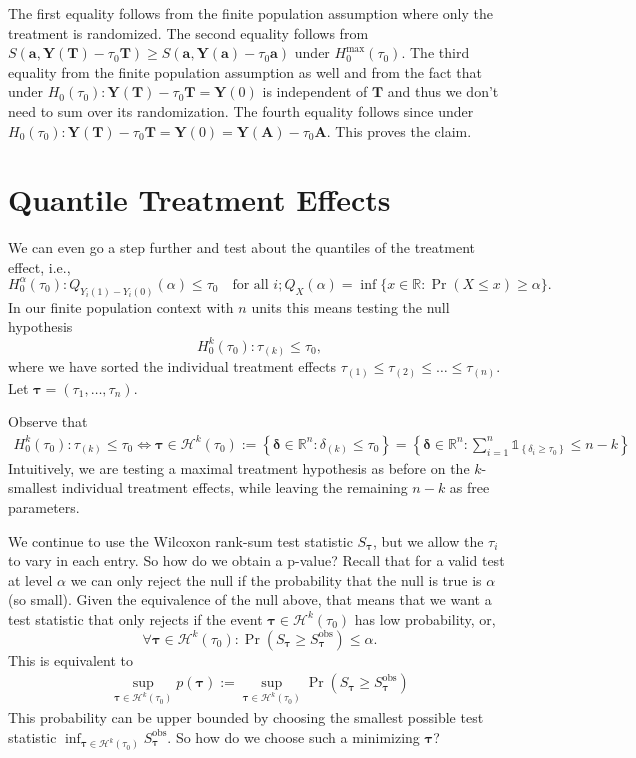 \documentclass[11pt]{exam}
\theoremstyle{plain}
\newcommand{\R}{\mathbb{R}}
\newcommand{\lt}{\left}
\newcommand{\rt}{\right}
\newcommand{\Ind}[1]{\mathds{1}_{\lt\{ #1 \rt\}}}
\begin{document}
The first equality follows from the finite population assumption where only the treatment is randomized. The second equality follows from $S(\bm{a}, \bm{Y}(\bm{T}) - \tau_0 \bm{T}) \geq S(\bm{a}, \bm{Y}(\bm{a}) - \tau_0 \bm{a})$ under $H^{\max}_0(\tau_0)$. The third equality from the finite population assumption as well and from the fact that under $H_0(\tau_0): \bm{Y}(\bm{T}) - \tau_0 \bm{T} = \bm{Y}(0)$ is independent of $\bm{T}$ and thus we don't need to sum over its randomization. The fourth equality follows since under $H_0(\tau_0): \bm{Y}(\bm{T}) - \tau_0 \bm{T} = \bm{Y}(0) = \bm{Y}(\bm{A}) - \tau_0 \bm{A}$. This proves the claim. 

\section{Quantile Treatment Effects}
We can even go a step further and test about the quantiles of the treatment effect, i.e., 
\[
H^\alpha_0(\tau_0): Q_{Y_i(1) - Y_i(0)}(\alpha) \leq \tau_0 \quad \text{for all } i; Q_X(\alpha) = \inf\{x \in \R: \Pr(X \leq x) \geq \alpha\}.
\]
In our finite population context with $n$ units this means testing the null hypothesis
\[
H_0^k(\tau_0): \tau_{(k)} \leq \tau_0,
\]
where we have sorted the individual treatment effects $\tau_{(1)} \leq \tau_{(2)} \leq \ldots \leq \tau_{(n)}$. Let $\bm \tau = (\tau_1, \ldots, \tau_n)$.

Observe that 
\begin{align*}
    H_0^k(\tau_0): \tau_{(k)} \leq \tau_0 \Leftrightarrow \bm{\tau} \in \mathcal{H}^k(\tau_0) := \lt\{ \bm{\delta} \in \R^n : \delta_{(k)} \leq \tau_0 \rt\} =\lt\{ \bm{\delta} \in \R^n : \sum_{i=1}^n\Ind{\delta_i \geq \tau_0} \leq n-k \rt\}
\end{align*}
Intuitively, we are testing a maximal treatment hypothesis as before on the $k$-smallest individual treatment effects, while leaving the remaining $n-k$ as free parameters.

We continue to use the Wilcoxon rank-sum test statistic $S_{\bm \tau}$, but we allow the $\tau_i$ to vary in each entry. 
So how do we obtain a p-value? Recall that for a valid test at level $\alpha$ we can only reject the null if the probability that the null is true is $\alpha$ (so small). Given the equivalence of the null above, that means that we want a test statistic that only rejects if the event $\bm{\tau} \in \mathcal{H}^k(\tau_0)$ has low probability, or,
\[
\forall \bm{\tau} \in \mathcal{H}^k(\tau_0): \Pr(S_{\bm \tau} \geq S^{\text{obs}}_{\bm \tau}) \leq \alpha.
\]
This is equivalent to
\begin{align*}
    \sup_{\bm{\tau} \in \mathcal{H}^k(\tau_0)} p(\bm \tau) := \sup_{\bm{\tau} \in \mathcal{H}^k(\tau_0)} \Pr(S_{\bm \tau} \geq S^{\text{obs}}_{\bm \tau})
\end{align*}
This probability can be upper bounded by choosing the smallest possible test statistic $\inf_{\bm{\tau} \in \mathcal{H}^k(\tau_0)} S^{\text{obs}}_{\bm \tau}$. So how do we choose such a minimizing $\bm \tau$? 
\end{document}
